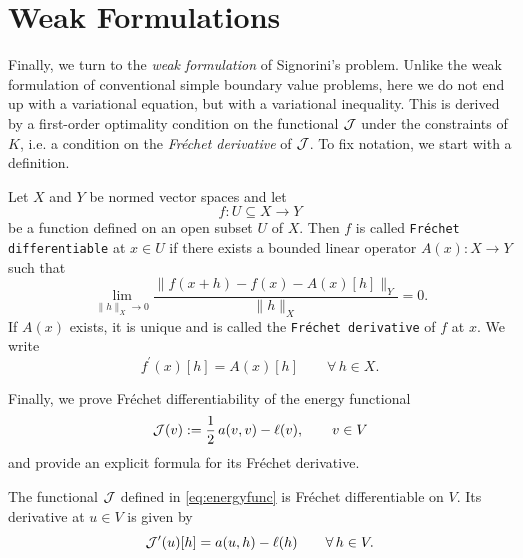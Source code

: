 \section{Weak Formulations}

Finally, we turn to the {\em weak formulation} of Signorini's problem. Unlike the weak formulation of conventional simple boundary value problems, here we do not end up with a variational equation, but with a variational inequality. This is derived by a first-order optimality condition on the functional ${\mathcal J}$ under the constraints of $K$, i.e. a condition on the {\em Fréchet derivative} of ${\mathcal J}$. To fix notation, we start with a definition.

\begin{definition}\label{def:frechetdiff}
	Let $X$ and $Y$ be normed vector spaces and let
	\begin{equation*}
		f:U\subseteq X\to Y
	\end{equation*}
	be a function defined on an open subset $U$ of $X$. Then $f$ is called {\tt Fréchet differentiable} at $x \in U$ if there exists a bounded linear operator $A(x):X\to Y$ such that
	\begin{equation*}
		\lim_{\|h\|_X\to 0} \frac{\|f(x+h)-f(x)-A(x)[h]\|_Y}{\|h\|_X}=0.
	\end{equation*}
	If $A(x)$ exists, it is unique and is called the {\tt Fréchet derivative} of $f$ at $x$. We write
	\begin{equation*}
		f^\prime(x)[h]=A(x)[h]\qquad \forall\, h\in X.
	\end{equation*}
\end{definition}

Finally, we prove Fréchet differentiability of the energy functional
\begin{equation*}
	{\mathcal J}(v) := \frac{1}{2}\,a(v,v)-\ell(v),\qquad v\in V
\end{equation*}
and provide an explicit formula for its Fréchet derivative.

\begin{lemma}\label{lem:Jdiff}
	The functional ${\mathcal J}$ defined in \eqref{eq:energyfunc} is Fréchet differentiable on $V$. Its derivative at $u\in V$ is given by
	\begin{equation*}
		{\mathcal J}'(u)[h] = a(u,h)-\ell(h)\qquad \forall\, h\in V.
	\end{equation*}
\end{lemma}

